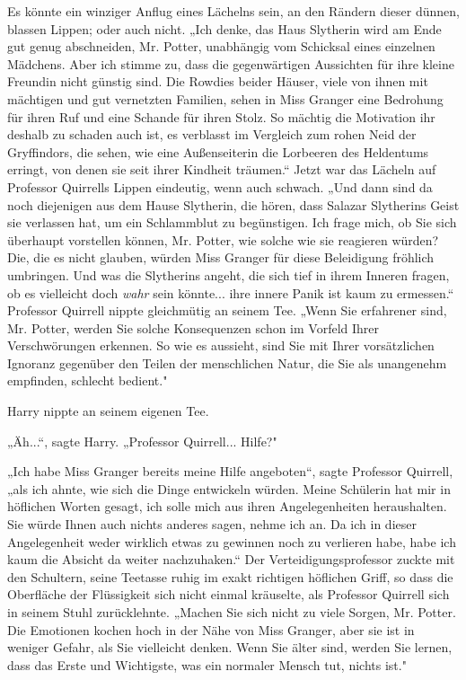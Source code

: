 {Es könnte ein winziger Anflug eines Lächelns sein, an den Rändern dieser dünnen, blassen Lippen; oder auch nicht. „Ich denke, das Haus Slytherin wird am Ende gut genug abschneiden, Mr. Potter, unabhängig vom Schicksal eines einzelnen Mädchens. Aber ich stimme zu, dass die gegenwärtigen Aussichten für ihre kleine Freundin nicht günstig sind. Die Rowdies beider Häuser, viele von ihnen mit mächtigen und gut vernetzten Familien, sehen in Miss Granger eine Bedrohung für ihren Ruf und eine Schande für ihren Stolz. So mächtig die Motivation ihr deshalb zu schaden auch ist, es verblasst im Vergleich zum rohen Neid der Gryffindors, die sehen, wie eine Außenseiterin die Lorbeeren des Heldentums erringt, von denen sie seit ihrer Kindheit träumen.“ Jetzt war das Lächeln auf Professor Quirrells Lippen eindeutig, wenn auch schwach. „Und dann sind da noch diejenigen aus dem Hause Slytherin, die hören, dass Salazar Slytherins Geist sie verlassen hat, um ein Schlammblut zu begünstigen. Ich frage mich, ob Sie sich überhaupt vorstellen können, Mr. Potter, wie solche wie sie reagieren würden? Die, die es nicht glauben, würden Miss Granger für diese Beleidigung fröhlich umbringen. Und was die Slytherins angeht, die sich tief in ihrem Inneren fragen, ob es vielleicht doch \emph{wahr} sein könnte... ihre innere Panik ist kaum zu ermessen.“ Professor Quirrell nippte gleichmütig an seinem Tee. „Wenn Sie erfahrener sind, Mr. Potter, werden Sie solche Konsequenzen schon im Vorfeld Ihrer Verschwörungen erkennen. So wie es aussieht, sind Sie mit Ihrer vorsätzlichen Ignoranz gegenüber den Teilen der menschlichen Natur, die Sie als unangenehm empfinden, schlecht bedient."

Harry nippte an seinem eigenen Tee.

„Äh...“, sagte Harry. „Professor Quirrell... Hilfe?"

„Ich habe Miss Granger bereits meine Hilfe angeboten“, sagte Professor Quirrell, „als ich ahnte, wie sich die Dinge entwickeln würden. Meine Schülerin hat mir in höflichen Worten gesagt, ich solle mich aus ihren Angelegenheiten heraushalten. Sie würde Ihnen auch nichts anderes sagen, nehme ich an. Da ich in dieser Angelegenheit weder wirklich etwas zu gewinnen noch zu verlieren habe, habe ich kaum die Absicht da weiter nachzuhaken.“ Der Verteidigungsprofessor zuckte mit den Schultern, seine Teetasse ruhig im exakt richtigen höflichen Griff, so dass die Oberfläche der Flüssigkeit sich nicht einmal kräuselte, als Professor Quirrell sich in seinem Stuhl zurücklehnte. „Machen Sie sich nicht zu viele Sorgen, Mr. Potter. Die Emotionen kochen hoch in der Nähe von Miss Granger, aber sie ist in weniger Gefahr, als Sie vielleicht denken. Wenn Sie älter sind, werden Sie lernen, dass das Erste und Wichtigste, was ein normaler Mensch tut, nichts ist."

}

